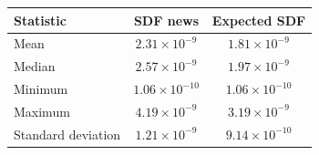 \begingroup
\fontsize{12.0pt}{14.4pt}\selectfont
\begin{tabular}{lcc}
\toprule
Statistic & SDF news & Expected SDF \\
\midrule
Mean & $2.31 \times 10^{-9}$ & $1.81 \times 10^{-9}$ \\
Median & $2.57 \times 10^{-9}$ & $1.97 \times 10^{-9}$ \\
Minimum & $1.06 \times 10^{-10}$ & $1.06 \times 10^{-10}$ \\
Maximum & $4.19 \times 10^{-9}$ & $3.19 \times 10^{-9}$ \\
Standard deviation & $1.21 \times 10^{-9}$ & $9.14 \times 10^{-10}$ \\
\bottomrule
\end{tabular}
\endgroup
